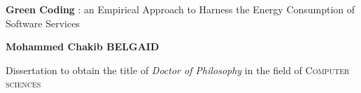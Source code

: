 \begin{center}
    \LARGE
    \textbf{Green Coding} : an Empirical Approach to Harness the Energy Consumption of Software Services

    \vspace{.8cm}
    \Large
    \textbf{Mohammed Chakib \textsc{BELGAID}}
    \vspace{0.8cm}
    \large

    Dissertation to obtain the title of \emph{Doctor of Philosophy} in the field of \textsc{Computer sciences}\\
    \vspace{0.8cm}


\end{center}
